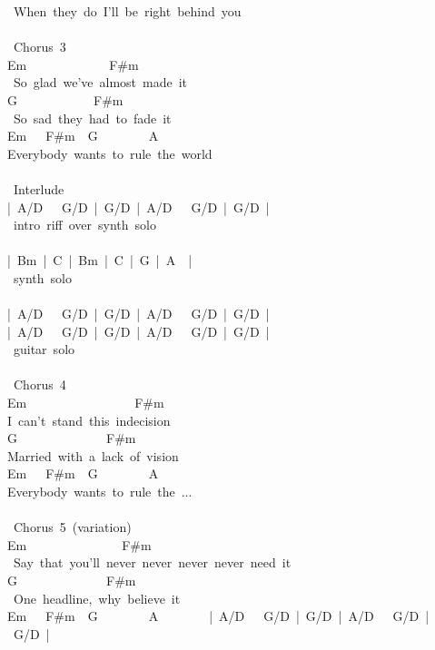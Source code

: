 {\ When\ they\ do\ I'll\ be\ right\ behind\ you\\
\\
\lbrack\ Chorus\ 3\rbrack\\
Em\ \ \ \ \ \ \ \ \ \ \ \ \ F\#m\\
\ So\ glad\ we've\ almost\ made\ it\\
G\ \ \ \ \ \ \ \ \ \ \ \ F\#m\\
\ So\ sad\ they\ had\ to\ fade\ it\\
Em\ \ \ F\#m\ \ G\ \ \ \ \ \ \ \ A\\
Everybody\ wants\ to\ rule\ the\ world\\
\\
\lbrack\ Interlude\rbrack\\
|\ A/D\ \ \ G/D\ |\ G/D\ |\ A/D\ \ \ G/D\ |\ G/D\ |\\
\lbrack\ intro\ riff\ over\ synth\ solo\rbrack\\
\\
|\ Bm\ |\ C\ |\ Bm\ |\ C\ |\ G\ |\ A\ \ |\\
\lbrack\ synth\ solo\rbrack\\
\\
|\ A/D\ \ \ G/D\ |\ G/D\ |\ A/D\ \ \ G/D\ |\ G/D\ |\\
|\ A/D\ \ \ G/D\ |\ G/D\ |\ A/D\ \ \ G/D\ |\ G/D\ |\\
\lbrack\ guitar\ solo\rbrack\\
\\
\lbrack\ Chorus\ 4\rbrack\\
Em\ \ \ \ \ \ \ \ \ \ \ \ \ \ \ \ \ F\#m\\
I\ can't\ stand\ this\ indecision\\
G\ \ \ \ \ \ \ \ \ \ \ \ \ \ F\#m\\
Married\ with\ a\ lack\ of\ vision\\
Em\ \ \ F\#m\ \ G\ \ \ \ \ \ \ \ A\\
Everybody\ wants\ to\ rule\ the\ ...\\
\\
\lbrack\ Chorus\ 5\rbrack\ (variation)\\
Em\ \ \ \ \ \ \ \ \ \ \ \ \ \ \ F\#m\\
\ Say\ that\ you'll\ never\ never\ never\ never\ need\ it\\
G\ \ \ \ \ \ \ \ \ \ \ \ \ \ F\#m\\
\ One\ headline,\ why\ believe\ it\\
Em\ \ \ F\#m\ \ G\ \ \ \ \ \ \ \ A\ \ \ \ \ \ \ \ |\ A/D\ \ \ G/D\ |\ G/D\ |\ A/D\ \ \ G/D\ |\ G/D\ |\\
}
